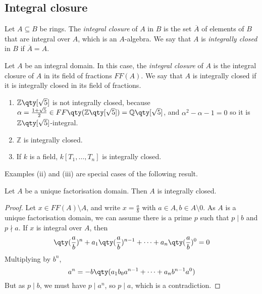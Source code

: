 \subsection{Integral closure}
\begin{definition}
    Let \( A \subseteq B \) be rings.
    The \emph{integral closure} of \( A \) in \( B \) is the set \( \overline A \) of elements of \( B \) that are integral over \( A \), which is an \( A \)-algebra.
    We say that \( A \) is \emph{integrally closed} in \( B \) if \( \overline A = A \).
\end{definition}
\begin{definition}
    Let \( A \) be an integral domain.
    In this case, the \emph{integral closure} of \( A \) is the integral closure of \( A \) in its field of fractions \( FF(A) \).
    We say that \( A \) is integrally closed if it is integrally closed in its field of fractions.
\end{definition}
\begin{example}
    \begin{enumerate}
        \item \( \mathbb Z\qty[\sqrt{5}] \) is not integrally closed, because \( \alpha = \frac{1 + \sqrt{5}}{2} \in FF\qty(\mathbb Z\qty[\sqrt{5}]) = \mathbb Q\qty[\sqrt{5}] \), and \( \alpha^2 - \alpha - 1 = 0 \) so it is \( \mathbb Z\qty[\sqrt{5}] \)-integral.
        \item \( \mathbb Z \) is integrally closed.
        \item If \( k \) is a field, \( k[T_1, \dots, T_n] \) is integrally closed.
    \end{enumerate}
\end{example}
Examples (ii) and (iii) are special cases of the following result.
\begin{proposition}
    Let \( A \) be a unique factorisation domain.
    Then \( A \) is integrally closed.
\end{proposition}
\begin{proof}
    Let \( x \in FF(A) \setminus A \), and write \( x = \frac{a}{b} \) with \( a \in A, b \in A \setminus \qty{0} \).
    As \( A \) is a unique factorisation domain, we can assume there is a prime \( p \) such that \( p \mid b \) and \( p \nmid a \).
    If \( x \) is integral over \( A \), then
    \[ \qty(\frac{a}{b})^n + a_1 \qty(\frac{a}{b})^{n-1} + \dots + a_n \qty(\frac{a}{b})^0 = 0 \]
    Multiplying by \( b^n \),
    \[ a^n = - b \qty(a_1 b_0 a^{n-1} + \dots + a_n b^{n-1} a^0) \]
    But as \( p \mid b \), we must have \( p \mid a^n \), so \( p \mid a \), which is a contradiction.
\end{proof}
